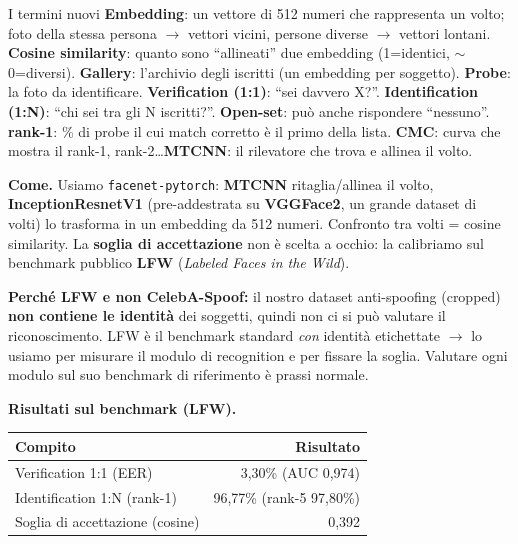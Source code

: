 \documentclass[11pt,a4paper]{article}
\newcommand{\say}[1]{``#1''}
\begin{document}
\begin{terminebox}{I termini nuovi}
\textbf{Embedding}: un vettore di 512 numeri che rappresenta un volto; foto della stessa persona
$\rightarrow$ vettori vicini, persone diverse $\rightarrow$ vettori lontani.
\textbf{Cosine similarity}: quanto sono \say{allineati} due embedding (1=identici, $\sim$0=diversi).
\textbf{Gallery}: l'archivio degli iscritti (un embedding per soggetto). \textbf{Probe}: la foto
da identificare. \textbf{Verification (1:1)}: \say{sei davvero X?}. \textbf{Identification (1:N)}:
\say{chi sei tra gli N iscritti?}. \textbf{Open-set}: pu\`o anche rispondere \say{nessuno}.
\textbf{rank-1}: \% di probe il cui match corretto \`e il primo della lista. \textbf{CMC}: curva
che mostra il rank-1, rank-2\dots \textbf{MTCNN}: il rilevatore che trova e allinea il volto.
\end{terminebox}

\textbf{Come.} Usiamo \texttt{facenet-pytorch}: \textbf{MTCNN} ritaglia/allinea il volto,
\textbf{InceptionResnetV1} (pre-addestrata su \textbf{VGGFace2}, un grande dataset di volti) lo
trasforma in un embedding da 512 numeri. Confronto tra volti = cosine similarity. La
\textbf{soglia di accettazione} non \`e scelta a occhio: la calibriamo sul benchmark pubblico
\textbf{LFW} (\textit{Labeled Faces in the Wild}).

\begin{perchebox}
\textbf{Perch\'e LFW e non CelebA-Spoof:} il nostro dataset anti-spoofing (cropped) \textbf{non
contiene le identit\`a} dei soggetti, quindi non ci si pu\`o valutare il riconoscimento. LFW \`e
il benchmark standard \emph{con} identit\`a etichettate $\rightarrow$ lo usiamo per misurare il
modulo di recognition e per fissare la soglia. Valutare ogni modulo sul suo benchmark di
riferimento \`e prassi normale.
\end{perchebox}

\textbf{Risultati sul benchmark (LFW).}
\begin{center}\small
\begin{tabular}{@{}lr@{}}
\toprule
\textbf{Compito} & \textbf{Risultato} \\
\midrule
Verification 1:1 (EER) & 3,30\% (AUC 0,974) \\
Identification 1:N (rank-1) & 96,77\% (rank-5 97,80\%) \\
Soglia di accettazione (cosine) & 0,392 \\
\bottomrule
\end{tabular}
\end{center}
\end{document}
